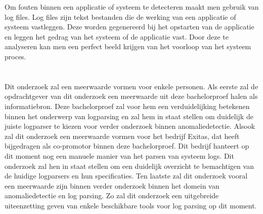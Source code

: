 Om fouten binnen een applicatie of systeem te detecteren maakt men gebruik van log files. Log files zijn tekst bestanden die de werking van een applicatie of systeem vastleggen. Deze worden gegenereerd bij het opstarten van de applicatie en leggen het gedrag van het systeem of de applicatie vast. Door deze te analyseren kan men een perfect beeld krijgen van het voorloop van het systeem proces.

\section{}
\label{sec:probleemstelling}


Dit onderzoek zal een meerwaarde vormen voor enkele personen. Als eerste zal de opdrachtgever van dit onderzoek een meerwaarde uit deze bachelorproef halen als informatiebron. Deze bachelorproef zal voor hem een verduidelijking betekenen binnen het onderwerp van logparsing en zal hem in staat stellen om duidelijk de juiste logparser te kiezen voor verder onderzoek binnen anomaliedetectie. Alsook zal dit onderzoek een meerwaarde vormen voor het bedrijf Exitas, dat heeft bijgedragen als co-promotor binnen deze bachelorproef. Dit bedrijf hanteert op dit moment nog een manuele manier van het parsen van systeem logs. Dit onderzoek zal hen in staat stellen om een duidelijk overzicht te bemachtigen van de huidige logparsers en hun specificaties. Ten laatste zal dit onderzoek vooral een meerwaarde zijn binnen verder onderzoek binnen het domein van anomaliedetectie en log parsing. Zo zal dit onderzoek een uitgebreide uiteenzetting geven van enkele beschikbare tools voor log parsing op dit moment. 


\section{}
\label{sec:onderzoeksvraag}

